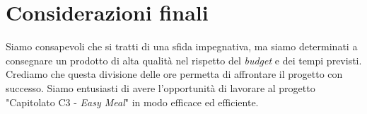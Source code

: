 \section{Considerazioni finali}

Siamo consapevoli che si tratti di una sfida impegnativa, ma siamo determinati a
consegnare un prodotto di alta qualità nel rispetto del \textit{budget} e dei tempi
previsti. \\
Crediamo che questa divisione delle ore permetta di affrontare il
progetto con successo. Siamo entusiasti di avere l'opportunità di lavorare al
progetto "Capitolato C3 - \textit{Easy Meal}" in modo efficace ed
efficiente.
